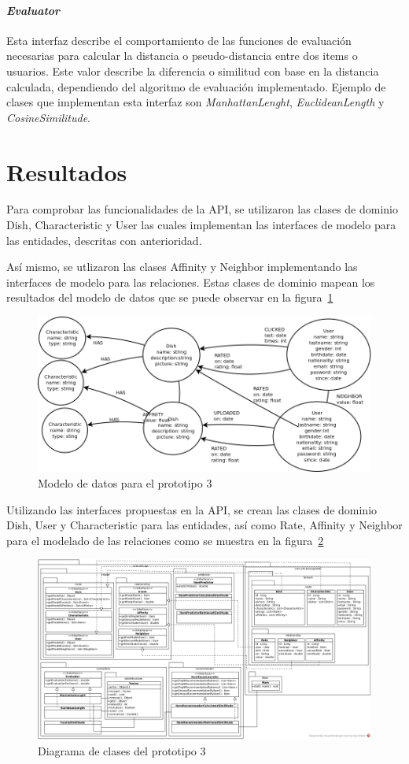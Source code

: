 \paragraph{\emph{Evaluator}}
Esta interfaz describe el comportamiento de las funciones de evaluación necesarias para calcular la distancia o pseudo-distancia entre dos items o usuarios. Este valor describe la diferencia o similitud con base en la distancia calculada, dependiendo del algoritmo de evaluación implementado. Ejemplo de clases que implementan esta interfaz son \emph{ManhattanLenght}, \emph{EuclideanLength} y \emph{CosineSimilitude}. 

    
\section{Resultados}
Para comprobar las funcionalidades de la API, se utilizaron las clases de dominio Dish, Characteristic y User las cuales implementan las interfaces de modelo para las entidades, descritas con anterioridad.

Así mismo, se utlizaron las clases Affinity y Neighbor implementando las interfaces de modelo para las relaciones. Estas clases de dominio mapean los resultados del modelo de datos que se puede observar en la figura~\ref{fig:p3_db}

\begin{figure}[h!]
	\centering
	\includegraphics[width=16cm]{./images/p3_bd}
	\caption{Modelo de datos para el prototipo 3}
	\label{fig:p3_db}
\end{figure}

Utilizando las interfaces propuestas en la API, se crean las clases de dominio Dish, User y Characteristic para las entidades, así como Rate, Affinity y Neighbor para el modelado de las relaciones como se muestra en la figura~\ref{fig:p3_classes}

\begin{landscape}
	\begin{figure}[h!]
		\centering
		\includegraphics[width=25cm]{./images/p3_classes}
		\caption{Diagrama de clases del prototipo 3}
		\label{fig:p3_classes}
	\end{figure}
\end{landscape}




